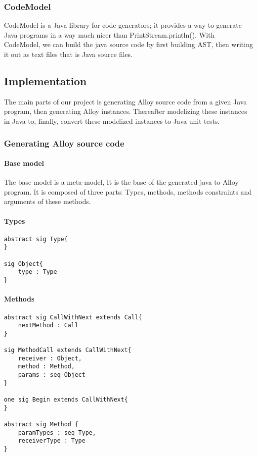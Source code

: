 \subsubsection{CodeModel}
CodeModel is a Java library for code generators; it provides a way to generate Java programs in a way much nicer than PrintStream.println().
With CodeModel, we can build the java source code by first building AST, then writing it out as text files that is Java source files.\cite{codeModel}

\subsection{Implementation}
The main parts of our project is generating Alloy source code from a given Java program, then generating Alloy instances. Thereafter modelizing these instances in Java to, finally, convert these modelized instances to Java unit tests.

\subsubsection{Generating Alloy source code}
\paragraph{Base model}
The base model is a meta-model, It is the base of the generated java to Alloy program.
It is composed of three parts: Types, methods, methods constraints and arguments of these methods.
\paragraph{Types}
\lstset{language=Alloy} 
\begin{lstlisting}[frame=single]
abstract sig Type{
}

sig Object{
    type : Type
}

\end{lstlisting}

\paragraph{Methods}
\lstset{language=Alloy} 
\begin{lstlisting}[frame=single]
abstract sig CallWithNext extends Call{
    nextMethod : Call
}

sig MethodCall extends CallWithNext{
    receiver : Object,
    method : Method,
    params : seq Object
}

one sig Begin extends CallWithNext{
}

abstract sig Method {
    paramTypes : seq Type,
    receiverType : Type
}

\end{lstlisting}


